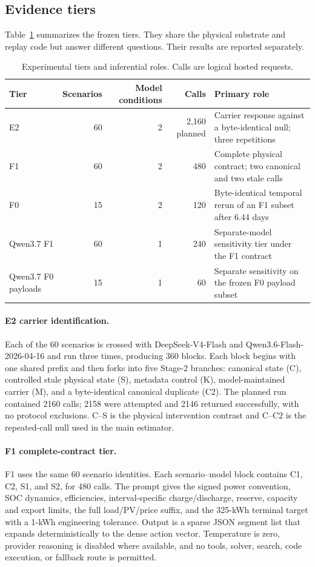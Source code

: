 \documentclass[11pt]{article}
\newcommand{\EIIBlocks}{360}
\newcommand{\EIIPlannedCalls}{2160}
\newcommand{\EIIActualCalls}{2158}
\newcommand{\EIISuccessfulCalls}{2146}
\newcommand{\FOneBranches}{480}
\begin{document}
\subsection{Evidence tiers}

Table~\ref{tab:tiers} summarizes the frozen tiers. They share the physical substrate and replay
code but answer different questions. Their results are reported separately.

\begin{table}[!htbp]
\centering
\caption{Experimental tiers and inferential roles. Calls are logical hosted requests.}
\label{tab:tiers}
\small
\begin{tabularx}{\textwidth}{@{}lrrrX@{}}
\toprule
Tier & Scenarios & Model conditions & Calls & Primary role \\
\midrule
E2 & 60 & 2 & 2,160 planned & Carrier response against a byte-identical null; three repetitions \\
F1 & 60 & 2 & 480 & Complete physical contract; two canonical and two stale calls \\
F0 & 15 & 2 & 120 & Byte-identical temporal rerun of an F1 subset after 6.44 days \\
Qwen3.7 F1 & 60 & 1 & 240 & Separate-model sensitivity tier under the F1 contract \\
Qwen3.7 F0 payloads & 15 & 1 & 60 & Separate sensitivity on the frozen F0 payload subset \\
\bottomrule
\end{tabularx}
\end{table}

\paragraph{E2 carrier identification.}
Each of the 60 scenarios is crossed with DeepSeek-V4-Flash and
Qwen3.6-Flash-2026-04-16 and run three times, producing \EIIBlocks{} blocks. Each block begins with
one shared prefix and then forks into five Stage-2 branches: canonical state (C), controlled stale
physical state (S), metadata control (K), model-maintained carrier (M), and a byte-identical
canonical duplicate (C2). The planned run contained \EIIPlannedCalls{} calls;
\EIIActualCalls{} were attempted and
\EIISuccessfulCalls{} returned successfully, with no protocol exclusions. C--S is the physical
intervention contrast and C--C2 is the repeated-call null used in the main estimator.

\paragraph{F1 complete-contract tier.}
F1 uses the same 60 scenario identities. Each scenario--model block contains C1, C2, S1, and S2,
for \FOneBranches{} calls. The prompt gives the signed power convention, SOC dynamics, efficiencies,
interval-specific charge/discharge, reserve, capacity and export limits, the full load/PV/price
suffix, and the 325-kWh terminal target with a 1-kWh engineering tolerance. Output is a sparse
JSON segment list that expands deterministically to the dense action vector. Temperature is zero,
provider reasoning is disabled where available, and no tools, solver, search, code execution, or
fallback route is permitted.
\end{document}
